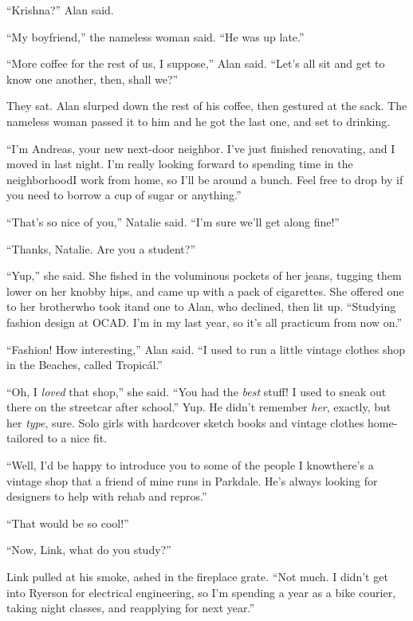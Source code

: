 ``Krishna?'' Alan said.

``My boyfriend,'' the nameless woman said.  ``He was up late.''

``More coffee for the rest of us, I suppose,'' Alan said.  ``Let's all
sit and get to know one another, then, shall we?''

They sat.  Alan slurped down the rest of his coffee, then gestured at
the sack.  The nameless woman passed it to him and he got the last
one, and set to drinking.

``I'm Andreas, your new next-door neighbor.  I've just finished
renovating, and I moved in last night.  I'm really looking forward to
spending time in the neighborhood\dash{}I work from home, so I'll be
around a bunch.  Feel free to drop by if you need to borrow a cup of
sugar or anything.''

``That's so nice of you,'' Natalie said.  ``I'm sure we'll get along
fine!''

``Thanks, Natalie.  Are you a student?''

``Yup,'' she said.  She fished in the voluminous pockets of her jeans,
tugging them lower on her knobby hips, and came up with a pack of
cigarettes.  She offered one to her brother\dash{}who took it\dash{}and one to
Alan, who declined, then lit up.  ``Studying fashion design at OCAD. 
I'm in my last year, so it's all practicum from now on.''

``Fashion!  How interesting,'' Alan said.  ``I used to run a little
vintage clothes shop in the Beaches, called Tropic\'{a}l.''

``Oh, I \textit{loved} that shop,'' she said.  ``You had the
\textit{best} stuff!  I used to sneak out there on the streetcar after
school.'' Yup.  He didn't remember \textit{her}, exactly, but her
\textit{type}, sure.  Solo girls with hardcover sketch books and
vintage clothes home-tailored to a nice fit.

``Well, I'd be happy to introduce you to some of the people I
know\dash{}there's a vintage shop that a friend of mine runs in Parkdale. 
He's always looking for designers to help with rehab and repros.''

``That would be so cool!''

``Now, Link, what do you study?''

Link pulled at his smoke, ashed in the fireplace grate.  ``Not much. 
I didn't get into Ryerson for electrical engineering, so I'm spending
a year as a bike courier, taking night classes, and reapplying for
next year.''


